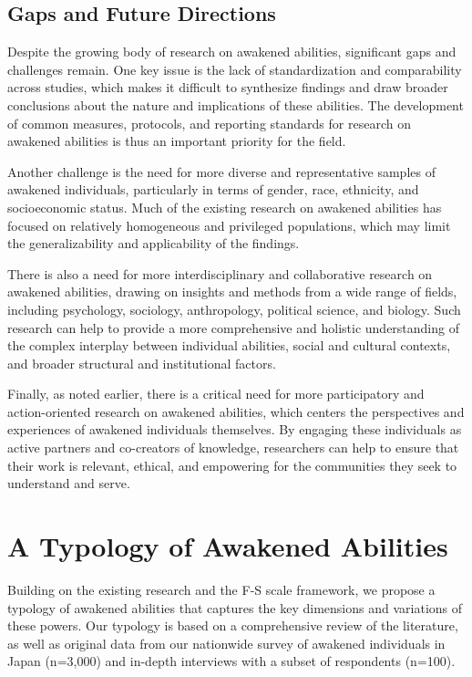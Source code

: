 \documentclass[12pt]{article}
\begin{document}
\subsection{Gaps and Future Directions}
Despite the growing body of research on awakened abilities, significant gaps and challenges remain. One key issue is the lack of standardization and comparability across studies, which makes it difficult to synthesize findings and draw broader conclusions about the nature and implications of these abilities. The development of common measures, protocols, and reporting standards for research on awakened abilities is thus an important priority for the field.

Another challenge is the need for more diverse and representative samples of awakened individuals, particularly in terms of gender, race, ethnicity, and socioeconomic status. Much of the existing research on awakened abilities has focused on relatively homogeneous and privileged populations, which may limit the generalizability and applicability of the findings.

There is also a need for more interdisciplinary and collaborative research on awakened abilities, drawing on insights and methods from a wide range of fields, including psychology, sociology, anthropology, political science, and biology. Such research can help to provide a more comprehensive and holistic understanding of the complex interplay between individual abilities, social and cultural contexts, and broader structural and institutional factors.

Finally, as noted earlier, there is a critical need for more participatory and action-oriented research on awakened abilities, which centers the perspectives and experiences of awakened individuals themselves. By engaging these individuals as active partners and co-creators of knowledge, researchers can help to ensure that their work is relevant, ethical, and empowering for the communities they seek to understand and serve.

\section{A Typology of Awakened Abilities}
Building on the existing research and the F-S scale framework, we propose a typology of awakened abilities that captures the key dimensions and variations of these powers. Our typology is based on a comprehensive review of the literature, as well as original data from our nationwide survey of awakened individuals in Japan (n=3,000) and in-depth interviews with a subset of respondents (n=100).
\end{document}
